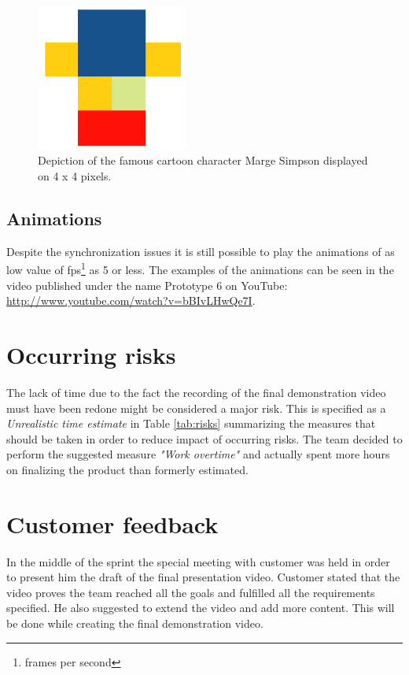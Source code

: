 \begin{figure}[H]
	\centering
		\includegraphics[width=5cm]{./sprint6/marge.png}
	\caption{Depiction of the famous cartoon character Marge Simpson displayed on 4 x 4 pixels.}
	\label{fig:sprint6_marge}
\end{figure}

\subsection{Animations}
Despite the synchronization issues it is still possible to play the animations of as low value of fps\footnote{frames per second} as 5 or less. The examples of the animations can be seen in the video published under the name Prototype 6 on YouTube: \url{http://www.youtube.com/watch?v=bBIvLHwQe7I}.

\section{Occurring risks}
The lack of time due to the fact the recording of the final demonstration video must have been redone might be considered a major risk. This is specified as a \textit{Unrealistic time estimate} in Table \ref{tab:risks} summarizing the measures that should be taken in order to reduce impact of occurring risks. The team decided to perform the suggested measure \textit{"Work overtime"} and actually spent more hours on finalizing the product than formerly estimated.

\section{Customer feedback}
In the middle of the sprint the special meeting with customer was held in order to present him the draft of the final presentation video. Customer stated that the video proves the team reached all the goals and fulfilled all the requirements specified. He also suggested to extend the video and add more content. This will be done while creating the final demonstration video.

